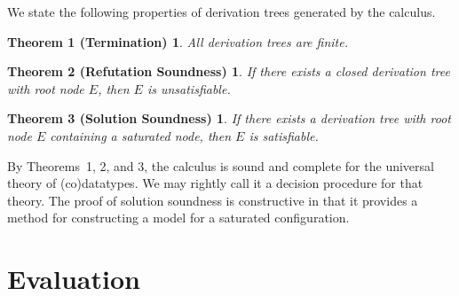\documentclass[letter]{article}
\newcommand\MU{\vvthinspace\mu\vvthinspace}
\theoremstyle{plain}
\newtheorem*{theoremi}{Theorem 1 (Termination)}
\newtheorem*{theoremii}{Theorem 2 (Refutation Soundness)}
\newtheorem*{theoremiii}{Theorem 3 (Solution Soundness)}
\theoremstyle{definition}
\newcommand\afterDot{\;} %
\newcommand{\Ec}{E}
\newcommand{\ec}[1]{[#1]}
\newcommand{\Val}{\mathcalx{A}\vvthinspace}
\newcommand{\ValC}{\smash{\mathcalx{A}^\star}}
\newcommand{\thD}{\mathcalx{DC}}
\newcommand\vvthinspace{\kern+0.041667em}
\begin{document}
We state the following properties of derivation trees generated by the calculus.

\begin{theoremi}
\label{thm:t}%
\afterDot
All derivation trees are finite.
\end{theoremi}

\begin{theoremii}
\label{thm:rs}%
\afterDot
If there exists a closed derivation tree with root node\/ $\Ec$, then\/ $\Ec$ is %
unsatisfiable.
\end{theoremii}

\begin{theoremiii}
\label{thm:ss}%
\afterDot
If there exists a derivation tree with root node $\Ec$ containing a saturated node, then $\Ec$ is %
satisfiable.
\end{theoremiii}

By Theorems~1, 2, and 3, the
calculus is sound and complete for the universal theory of (co)datatypes. We may
rightly call it a decision procedure for that theory.
The proof of solution soundness is constructive in that it provides a
method for constructing a model for a saturated configuration.


\section{Evaluation} %
\label{sec:evaluation}

\newcommand\gandl{SBT}
\newcommand\HD[1]{\hbox to2em{\relax\hfill\!\!\!\!#1\!\!\!\!\hfill}}
\end{document}
